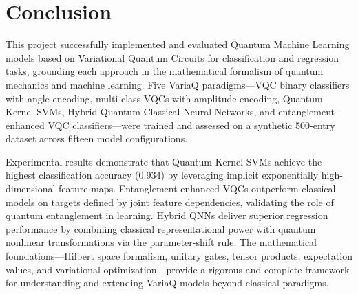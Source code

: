 \documentclass[conference]{IEEEtran}
\begin{document}
\section{Conclusion}

This project successfully implemented and evaluated Quantum Machine Learning models based on Variational Quantum Circuits for classification and regression tasks, grounding each approach in the mathematical formalism of quantum mechanics and machine learning. Five VariaQ paradigms---VQC binary classifiers with angle encoding, multi-class VQCs with amplitude encoding, Quantum Kernel SVMs, Hybrid Quantum-Classical Neural Networks, and entanglement-enhanced VQC classifiers---were trained and assessed on a synthetic 500-entry dataset across fifteen model configurations.

Experimental results demonstrate that Quantum Kernel SVMs achieve the highest classification accuracy (0.934) by leveraging implicit exponentially high-dimensional feature maps. Entanglement-enhanced VQCs outperform classical models on targets defined by joint feature dependencies, validating the role of quantum entanglement in learning. Hybrid QNNs deliver superior regression performance by combining classical representational power with quantum nonlinear transformations via the parameter-shift rule. The mathematical foundations---Hilbert space formalism, unitary gates, tensor products, expectation values, and variational optimization---provide a rigorous and complete framework for understanding and extending VariaQ models beyond classical paradigms.

\end{document}
